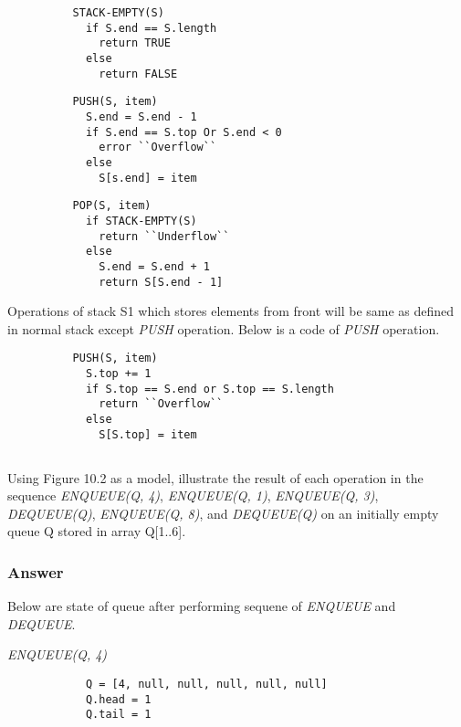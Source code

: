         \begin{verbatim}
          STACK-EMPTY(S)
            if S.end == S.length
              return TRUE
            else
              return FALSE
        \end{verbatim}

        \begin{verbatim}
          PUSH(S, item)
            S.end = S.end - 1
            if S.end == S.top Or S.end < 0
              error ``Overflow``
            else
              S[s.end] = item
        \end{verbatim}

        \begin{verbatim}
          POP(S, item)
            if STACK-EMPTY(S)
              return ``Underflow``
            else
              S.end = S.end + 1
              return S[S.end - 1]
        \end{verbatim}

        Operations of stack S1 which stores elements from front will be same as
        defined in normal stack except \textit{PUSH} operation. Below is a code
        of \textit{PUSH} operation.

        \begin{verbatim}
          PUSH(S, item)
            S.top += 1
            if S.top == S.end or S.top == S.length
              return ``Overflow``
            else
              S[S.top] = item
        \end{verbatim}

      \subsection{}

      Using Figure 10.2 as a model, illustrate the result of each operation in
      the sequence \textit{ENQUEUE(Q, 4)}, \textit{ENQUEUE(Q, 1)},
      \textit{ENQUEUE(Q, 3)}, \textit{DEQUEUE(Q)}, \textit{ENQUEUE(Q, 8)}, and
      \textit{DEQUEUE(Q)} on an initially empty queue Q stored in array
      Q[1..6].

        \subsubsection{Answer}

          Below are state of queue after performing sequene of \textit{ENQUEUE}
          and \textit{DEQUEUE}.

          \textit{ENQUEUE(Q, 4)}
          \begin{verbatim}
            Q = [4, null, null, null, null, null]
            Q.head = 1
            Q.tail = 1
          \end{verbatim}

